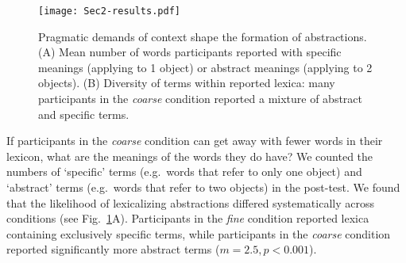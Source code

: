 \begin{figure}[t]
\begin{center}
\texttt{[image: Sec2-results.pdf]}
\caption{Pragmatic demands of context shape the formation of abstractions. (A) Mean number of words participants reported with specific meanings (applying to 1 object) or abstract meanings (applying to 2 objects). (B) Diversity of terms within reported lexica: many participants in the \emph{coarse} condition reported a mixture of abstract and specific terms.}
\label{fig:lexiconContent}
\end{center}
\end{figure}

If participants in the \emph{coarse} condition can get away with fewer words in their lexicon, what are the meanings of the words they do have? We counted the numbers of `specific' terms (e.g.\ words that refer to only one object) and `abstract' terms (e.g.\ words that refer to two objects) in the post-test. We found that the likelihood of lexicalizing abstractions differed systematically across conditions (see Fig.\ \ref{fig:lexiconContent}A). Participants in the \emph{fine} condition reported lexica containing exclusively specific terms, while participants in the \emph{coarse} condition reported significantly more abstract terms ($m = 2.5, p < 0.001$). 

